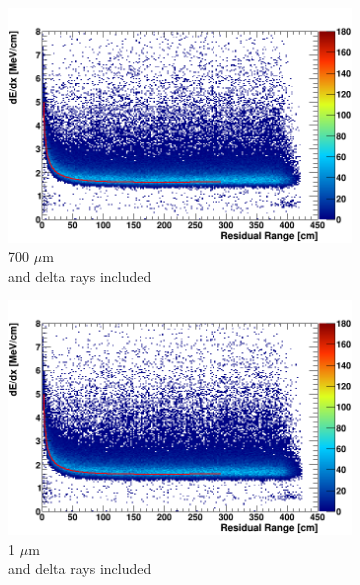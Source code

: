 \begin{figure}[t!]
        \begin{subfigure}[b]{0.495\textwidth}   
            \centering 
            \includegraphics[width=\textwidth]{derr_mu_delta_700um}
            \caption{700 $\mu$m \\ and delta rays included}%
            \label{fig:derr_mu_delta_700}
        \end{subfigure}
        \hfill
        \begin{subfigure}[b]{0.495\textwidth}   
            \centering 
            \includegraphics[width=\textwidth]{derr_mu_delta_1um}
            \caption{1 $\mu$m \\ and delta rays included}%
            \label{fig:derr_mu_delta_1}
        \end{subfigure}
        \begin{subfigure}[b]{0.495\textwidth}   

\end{subfigure}
\end{figure}

